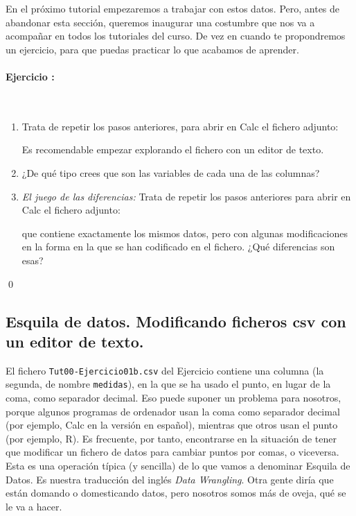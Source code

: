 \documentclass[10pt,a4paper]{article}\usepackage[]{graphicx}\usepackage[]{color}
\newcounter {cont01}
\begin{document}
En el próximo tutorial empezaremos a trabajar con estos datos. Pero, antes de abandonar esta
sección, queremos inaugurar una costumbre que nos va a acompañar en todos los tutoriales del curso.
De vez en cuando te propondremos un ejercicio, para que puedas practicar lo que acabamos de
aprender.

\paragraph{Ejercicio \theEjercicioI:}\quad\\
\begin{enumerate}
  \item Trata de repetir los pasos anteriores, para abrir en Calc el fichero adjunto:
        \begin{center}
        \end{center}
        Es recomendable empezar explorando el fichero con un editor de texto.
  \item ¿De qué tipo crees que son las variables de cada una de las columnas?
  \item {\em El juego de las diferencias:} Trata de repetir los pasos anteriores para abrir en
      Calc el fichero adjunto:
        \begin{center}
        \end{center}
        que contiene exactamente los mismos datos, pero con algunas modificaciones en la forma en
        la que se han codificado en el fichero. ¿Qué diferencias son esas?
\end{enumerate}
\qed


\subsection{Esquila de datos. Modificando ficheros csv con un editor de texto.}

El fichero {\tt Tut00-Ejercicio01b.csv} del Ejercicio {\theEjercicioI} contiene una columna (la
segunda, de nombre {\tt medidas}), en la que se ha usado el punto, en lugar de la coma, como
separador decimal. Eso puede suponer un problema para nosotros, porque algunos programas de
ordenador usan la coma como separador decimal (por ejemplo, Calc en la versión en español),
mientras que otros usan el punto (por ejemplo, R). Es frecuente, por tanto, encontrarse en la
situación de tener que modificar un fichero de datos para cambiar puntos por comas, o viceversa.
Esta es una operación típica (y sencilla) de lo que vamos a denominar {\sf Esquila de Datos}. Es
nuestra traducción del inglés {\em Data Wrangling}. Otra gente diría que están domando o
domesticando datos, pero nosotros somos más de oveja, qué se le va a hacer.
\end{document}
